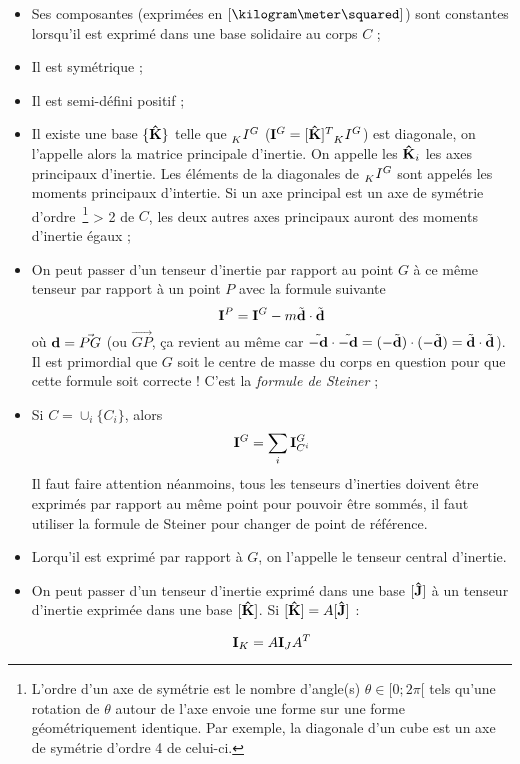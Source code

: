 \begin{itemize}
  \item Ses composantes (exprimées en $[\kilogram\meter\squared]$) sont constantes lorsqu'il 
	est exprimé dans une base solidaire au corps $C$ ;
  \item Il est symétrique ; 
  \item Il est semi-défini positif ;
  \item
    Il existe une base $\{{\bf\hat{K}}\}$ telle que $\wtr{K}{I}{G}$ ($\ine^G = [\uk]^T \wtr{K}{I}{G}$) 
		est diagonale, on l'appelle alors la matrice principale d'inertie.
    On appelle les ${\bf\hat{K}}_i$ les axes principaux d'inertie.
    Les éléments de la diagonales de $\wtr{K}{I}{G}$ sont appelés les moments principaux d'intertie.
    Si un axe principal est un axe de symétrie d'ordre~\footnote{L'ordre d'un axe de symétrie est le nombre d'angle(s) $\theta \in [0; 2\pi[$ tels qu'une rotation de $\theta$ autour de l'axe envoie une forme sur une forme géométriquement identique.
    Par exemple, la diagonale d'un cube est un axe de symétrie d'ordre 4 de celui-ci.}
    > 2 de $C$, les deux autres axes principaux auront des moments d'inertie égaux ;
  \item
    On peut passer d'un tenseur d'inertie par rapport au point $G$ à ce même tenseur par rapport à un point $P$ avec la formule suivante
    \[ {\bf I}^P =  {\bf I}^G - m \tilde{{\bf d}}\cdot\tilde{{\bf d}} \]
    où ${\bf d} = \vec{PG}$ (ou $\vec{GP}$, ça revient au même car $\tilde{-{\bf d}}\cdot\tilde{-{\bf d}} = (-\tilde{{\bf d}})\cdot(-\tilde{{\bf d}}) = \tilde{{\bf d}}\cdot\tilde{{\bf d}}$).
    Il est primordial que $G$ soit le centre de masse du corps en question pour que cette formule soit correcte !
    C'est la {\em formule de Steiner} ;
  \item
    Si $C = \cup_i \{C_i\}$, alors
    \[ {\bf I}^G = \sum_i {\bf I}_{C^i}^G \]
    Il faut faire attention néanmoins, tous les tenseurs d'inerties doivent
    être exprimés par rapport au même point pour pouvoir être sommés,
    il faut utiliser la formule de
    Steiner pour changer de point de référence.
  \item Lorqu'il est exprimé par rapport à $G$, on l'appelle le tenseur central d'inertie.
	\item On peut passer d'un tenseur d'inertie exprimé dans une base $[{\bf\hat{J}}]$ à un 
	tenseur d'inertie exprimée dans une base $[{\bf\hat{K}}]$. Si $[{\bf\hat{K}}] = A[{\bf\hat{J}}]$ :
	
	$${\bf I}_K = A {\bf I}_J A^T$$
\end{itemize}

